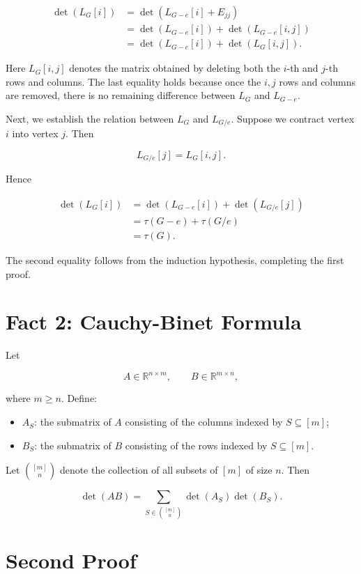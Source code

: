 \documentclass[
  a4paper,
  10pt]{article}
\providecommand{\tightlist}{%
  \setlength{\itemsep}{0pt}\setlength{\parskip}{0pt}}
\begin{document}
\[
\begin{aligned}
\det(L_G[i])
&= \det(L_{G-e}[i]+E_{jj}) \\
&= \det(L_{G-e}[i])+\det(L_{G-e}[i,j]) \\
&= \det(L_{G-e}[i])+\det(L_G[i,j]).
\end{aligned}
\]

Here \(L_G[i,j]\) denotes the matrix obtained by deleting both the
\(i\)-th and \(j\)-th rows and columns. The last equality holds because
once the \(i,j\) rows and columns are removed, there is no remaining
difference between \(L_G\) and \(L_{G-e}\).

Next, we establish the relation between \(L_G\) and \(L_{G/e}\). Suppose
we contract vertex \(i\) into vertex \(j\). Then

\[
L_{G/e}[j]=L_G[i,j].
\]

Hence

\[
\begin{aligned}
\det(L_G[i])
&= \det(L_{G-e}[i])+\det(L_{G/e}[j]) \\
&= \tau(G-e)+\tau(G/e) \\
&= \tau(G).
\end{aligned}
\]

The second equality follows from the induction hypothesis, completing
the first proof.

\section{Fact 2: Cauchy-Binet
Formula}\label{fact-2-cauchy-binet-formula}

Let

\[
A \in \mathbb{R}^{n \times m},
\qquad
B \in \mathbb{R}^{m \times n},
\]

where \(m \ge n\). Define:

\begin{itemize}
\tightlist
\item
  \(A_S\): the submatrix of \(A\) consisting of the columns indexed by
  \(S\subseteq[m]\);
\item
  \(B_S\): the submatrix of \(B\) consisting of the rows indexed by
  \(S\subseteq[m]\).
\end{itemize}

Let \(\binom{[m]}{n}\) denote the collection of all subsets of \([m]\)
of size \(n\). Then

\[
\det(AB)
=
\sum_{S \in \binom{[m]}{n}}
\det(A_S)\det(B_S).
\]

\section{Second Proof}\label{second-proof}
\end{document}
